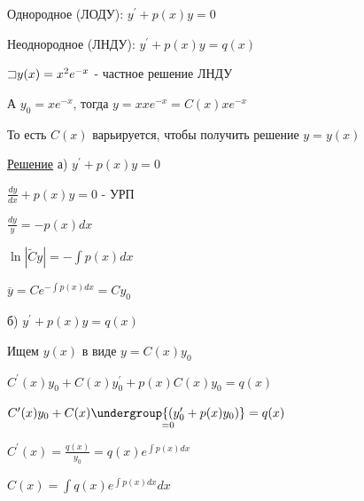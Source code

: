 \documentclass[12pt]{article}
\begin{document}
    \Def Однородное (ЛОДУ): $y^\prime + p(x)y = 0$

    \Def Неоднородное (ЛНДУ): $y^\prime + p(x)y = q(x)$

    \Ex $\mathord{\sqsupset} y(x) = x^2 e^{-x}$ - частное решение ЛНДУ

    А $y_0 = x e^{-x}$, тогда $y = x xe^{-x} = C(x) x e^{-x}$

    То есть $C(x)$ варьируется, чтобы получить решение $y = y(x)$

    \underline{Решение} а) $y^\prime + p(x)y = 0$

    $\frac{dy}{dx} + p(x)y = 0$ - УРП

    $\frac{dy}{y} = -p(x)dx$

    $\ln|\tilde{C}y| = -\int p(x)dx$

    $\overline{y} = Ce^{-\int p(x) dx} = Cy_0$

    б) $y^\prime + p(x)y = q(x)$

    Ищем $y(x)$ в виде $y = C(x)y_0$

    $C^\prime(x)y_0 + C(x)y^\prime_0 + p(x)C(x)y_0 = q(x)$

    $C^\prime(x)y_0 + C(x)\underset{=0}{\undergroup{(y^\prime_0 + p(x)y_0)}} = q(x)$

    $C^\prime(x) = \frac{q(x)}{y_0} = q(x)e^{\int p(x)dx}$

    $C(x) = \int q(x) e^{\int p(x)dx} dx$
\end{document}
